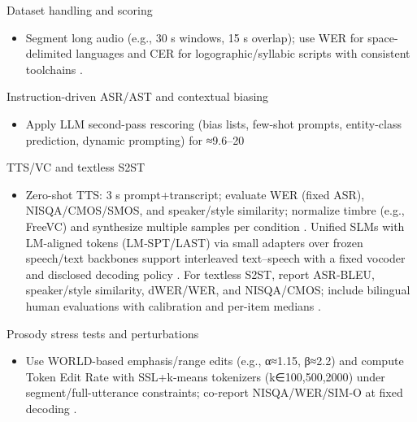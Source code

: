 Dataset handling and scoring
\begin{itemize}
  \item Segment long audio (e.g., 30 s windows, 15 s overlap); use WER for space-delimited languages and CER for logographic/syllabic scripts with consistent toolchains \cite{nguyen2025qwenvsgemmaintegrationwhispercomparative}.
\end{itemize}

Instruction-driven ASR/AST and contextual biasing
\begin{itemize}
  \item Apply LLM second-pass rescoring (bias lists, few-shot prompts, entity-class prediction, dynamic prompting) for ≈9.6–20%
\end{itemize}

TTS/VC and textless S2ST
\begin{itemize}
  \item Zero-shot TTS: 3 s prompt+transcript; evaluate WER (fixed ASR), NISQA/CMOS/SMOS, and speaker/style similarity; normalize timbre (e.g., FreeVC) and synthesize multiple samples per condition \cite{wang2024evaluatingtextspeechsynthesislargediscre}. Unified SLMs with LM-aligned tokens (LM‑SPT/LAST) via small adapters over frozen speech/text backbones support interleaved text–speech with a fixed vocoder and disclosed decoding policy \cite{turetzky2024lastlanguagemodelawarespeechtokenization,wang2023slmbridgethingapbetweenspeechtextfoundat,jo2025lmsptalignedsemanticdistillationspeechto}. For textless S2ST, report ASR‑BLEU, speaker/style similarity, dWER/WER, and NISQA/CMOS; include bilingual human evaluations with calibration and per-item medians \cite{peng2024mslms2stmultitaskspeechlanguagemodeltext,li2024investigatingneuralaudiocodecsspeechlang,huang2023holisticcascadesystembenchmarkhumanevalu}.
\end{itemize}

Prosody stress tests and perturbations
\begin{itemize}
  \item Use WORLD-based emphasis/range edits (e.g., α≈1.15, β≈2.2) and compute Token Edit Rate with SSL+k‑means tokenizers (k∈{100,500,2000}) under segment/full-utterance constraints; co-report NISQA/WER/SIM‑O at fixed decoding \cite{li2024investigatingneuralaudiocodecsspeechlang}.
\end{itemize}

